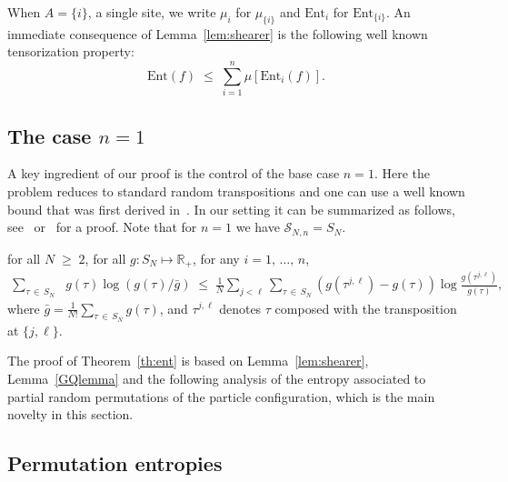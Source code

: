 \documentclass[AHL,Unicode,longabstracts,published]{cedram}
\renewcommand{\leq}{\;\leqslant\;}
\renewcommand{\geq}{\;\geqslant\;}
\newcommand{\ent}{\mathrm{Ent}}
\newcommand{\cS}{\mathcal{S}}
\newcommand{\bbR}{\mathbb{R}}
\let\t=\tau
\begin{document}
When $A=\{i\}$, a single site, we write $\mu_i$ for $\mu_{\{i\}}$ and $\ent_i$ for $\ent_{\{i\}}$. An immediate consequence of Lemma~\ref{lem:shearer} is the following well known tensorization property:
\begin{equation}\label{tensor}
\ent(f) \leq\sum_{i=1}^n \mu\left[\ent_{i}(f) \right].
\end{equation}


\subsection{The case \texorpdfstring{$n=1$}{n=1}}

A key ingredient of our proof is the control of the base case $n=1$. Here the problem reduces to standard random transpositions and one can use a well known bound that was first derived in~\cite{Goel,GQ}. In our setting it can be summarized as follows, see~\cite[Theorem~1]{GQ} or~\cite[Corollary~3.1]{Goel} for a proof. Note that for $n=1$ we have $\cS_{N,n} =S_N$.

\begin{lemm}
\label{GQlemma} for all $N\geq 2$, for all $g:S_N\mapsto\bbR_+$, for any $i=1,\,\dots,\,n$,
\begin{align*}
\sum_{\t\,\in\,S_N} &g(\t)\log(g(\t)/\bar g)
\leq \frac1N\sum_{j<\ell}
\sum_{\t\,\in\,S_N}
\left(g(\t^{j,\ell}) - g(\t)\right)\log \frac{g(\t^{j,\ell})}{g(\t)},
\end{align*}
where $\bar g = \frac1{N!}\sum_{\t\,\in\,S_N}g(\t)$, and $\t^{j,\ell}$ denotes $\t$ composed with the transposition at $\{j,\ell\}$.
\end{lemm}

The proof of Theorem~\ref{th:ent} is based on Lemma~\ref{lem:shearer}, Lemma~\ref{GQlemma} and the following analysis of the entropy associated to partial random permutations of the particle configuration, which is the main novelty in this section.

\subsection{Permutation entropies}
\end{document}
